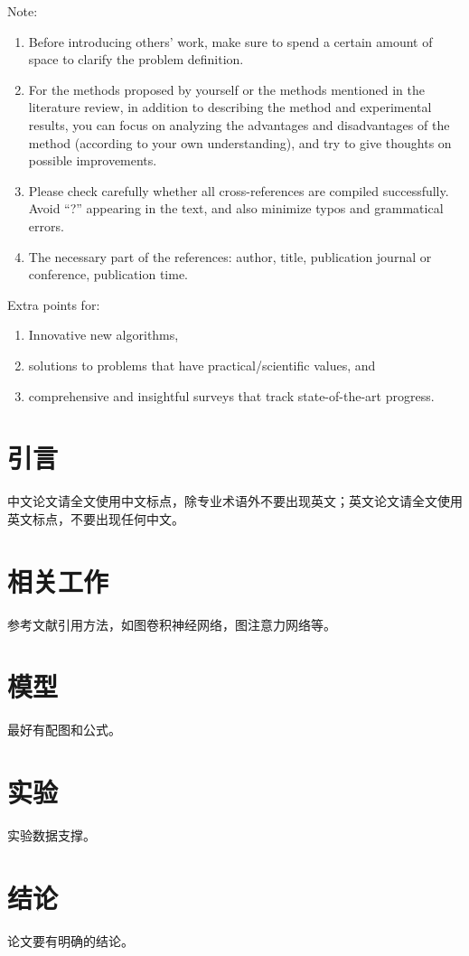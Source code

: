 \documentclass[conference]{IEEEtran}
\begin{document}
Note:
\begin{enumerate}
	\item Before introducing others' work, make sure to spend a certain amount of space to clarify the problem definition.
	\item For the methods proposed by yourself or the methods mentioned in the literature review, in addition to describing the method and experimental results, you can focus on analyzing the advantages and disadvantages of the method (according to your own understanding), and try to give thoughts on possible improvements.
	\item Please check carefully whether all cross-references are compiled successfully. Avoid ``?'' appearing in the text, and also minimize typos and grammatical errors.
	\item The necessary part of the references: author, title, publication journal or conference, publication time.
\end{enumerate}

Extra points for:
\begin{enumerate}
	\item Innovative new algorithms,
	\item solutions to problems that have practical/scientific values, and
	\item comprehensive and insightful surveys that track state-of-the-art progress.
\end{enumerate}







\section{引言}

中文论文请全文使用中文标点，除专业术语外不要出现英文；英文论文请全文使用英文标点，不要出现任何中文。

\section{相关工作}

参考文献引用方法，如图卷积神经网络\cite{kipf2017semi}，图注意力网络\cite{velivckovic2018graph}等。

\section{模型}

最好有配图和公式。

\section{实验}

实验数据支撑。

\section{结论}

论文要有明确的结论。



\end{document}
